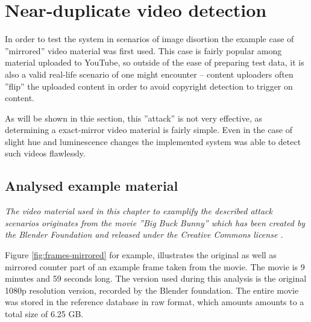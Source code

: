 \section{Near-duplicate video detection}
\label{sec:mirrored-video-detection}
In order to test the system in scenarios of image disortion the example case of ''mirrored'' video material was first used. This case is fairly popular among material uploaded to YouTube, so outside of the ease of preparing test data, it is also a valid real-life scenario of one might encounter -- content uploaders often ''flip'' the uploaded content in order to avoid copyright detection to trigger on content.

As will be shown in thie section, this ''attack'' is not very effective, as determining a exact-mirror video material is fairly simple. Even in the case of slight hue and luminescence changes the implemented system was able to detect such videos flawlessly.

\subsection{Analysed example material}
\textit{The video material used in this chapter to examplify the described attack scenarios originates from the movie ''\textit{Big Buck Bunny}'' \cite{big-buck-bunny} which has been created by the Blender Foundation \cite{blender-foundation} and released under the Creative Commons license \cite{creative-commons}.}

Figure \ref{fig:frames-mirrored} for example, illustrates the original as well as mirrored counter part of an example frame taken from the movie. The movie is 9 minutes and 59 seconds long. The version used during this analysis is the original 1080p resolution version, recorded by the Blender foundation. The entire movie was stored in the reference database in raw format, which amounts amounts to a total size of 6.25 GB.



